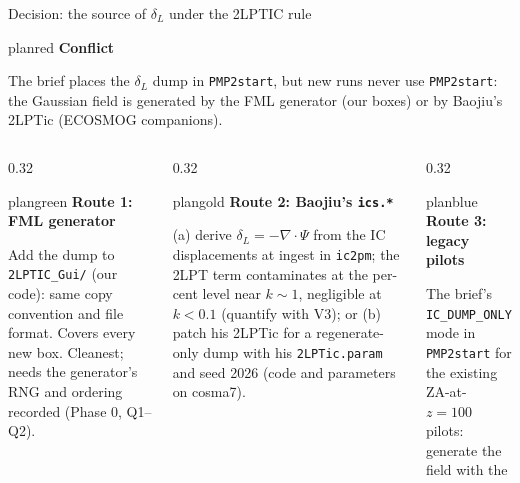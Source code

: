 \documentclass[UTF8]{beamer}
\begin{document}
\begin{frame}{Decision: the source of $\delta_L$ under the 2LPTIC rule}
  \footnotesize
  \begin{phasebox}[colback=planred!5]{planred}
    {\color{planred}\bfseries Conflict}\par\smallskip
    \scriptsize
    The brief places the $\delta_L$ dump in \texttt{PMP2start}, but new runs never use \texttt{PMP2start}: the Gaussian field is generated by the
    FML generator (our boxes) or by Baojiu's 2LPTic (ECOSMOG companions).
  \end{phasebox}
  \vspace{0.6ex}
  \begin{columns}[T,totalwidth=\textwidth]
    \begin{column}{0.32\textwidth}
      \begin{phasebox}{plangreen}
        {\color{plangreen}\bfseries Route 1: FML generator}\par\smallskip
        \scriptsize
        Add the dump to \texttt{2LPTIC\_Gui/} (our code): same copy convention and file format. Covers every new box.
        Cleanest; needs the generator's RNG and ordering recorded (Phase 0, Q1--Q2).
      \end{phasebox}
    \end{column}
    \hfill
    \begin{column}{0.32\textwidth}
      \begin{phasebox}{plangold}
        {\color{plangold}\bfseries Route 2: Baojiu's \texttt{ics.*}}\par\smallskip
        \scriptsize
        (a) derive $\delta_L = -\nabla\!\cdot\!\Psi$ from the IC displacements at ingest in \texttt{ic2pm}; the 2LPT term contaminates at the
        per-cent level near $k \sim 1$, negligible at $k < 0.1$ (quantify with V3); or (b) patch his 2LPTic for a regenerate-only dump with
        his \texttt{2LPTic.param} and seed 2026 (code and parameters on cosma7).
      \end{phasebox}
    \end{column}
    \hfill
    \begin{column}{0.32\textwidth}
      \begin{phasebox}{planblue}
        {\color{planblue}\bfseries Route 3: legacy pilots}\par\smallskip
        \scriptsize
        The brief's \texttt{IC\_DUMP\_ONLY} mode in \texttt{PMP2start} for the existing ZA-at-$z{=}100$ pilots: generate the field with the

\end{phasebox}
\end{column}
\end{columns}
\end{frame}
\end{document}
